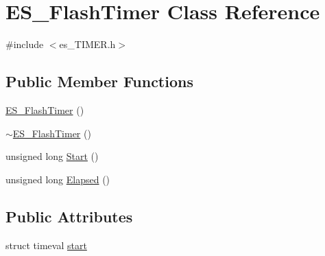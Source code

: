 \hypertarget{classES__FlashTimer}{\section{\-E\-S\-\_\-\-Flash\-Timer \-Class \-Reference}
\label{classES__FlashTimer}
}


{\ttfamily \#include $<$es\-\_\-\-T\-I\-M\-E\-R.\-h$>$}

\subsection*{\-Public \-Member \-Functions}
\begin{DoxyCompactItemize}
\item 
\hyperlink{classES__FlashTimer_a25419f65f9381917e6b4e8b868545d36}{\-E\-S\-\_\-\-Flash\-Timer} ()
\item 
\hyperlink{classES__FlashTimer_afc47dcca2631163eb2456e3c77798745}{$\sim$\-E\-S\-\_\-\-Flash\-Timer} ()
\item 
unsigned long \hyperlink{classES__FlashTimer_a75c860960f5b4e087bba6262ed585b47}{\-Start} ()
\item 
unsigned long \hyperlink{classES__FlashTimer_af47b015650c053682cf24d06edfe590c}{\-Elapsed} ()
\end{DoxyCompactItemize}
\subsection*{\-Public \-Attributes}
\begin{DoxyCompactItemize}
\item 
struct timeval \hyperlink{classES__FlashTimer_ab0b9b350850fd9be87f633524b7c50c9}{start}
\end{DoxyCompactItemize}


